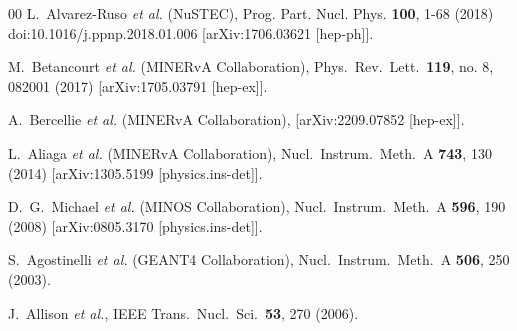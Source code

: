 \documentclass[aps,prl,twocolumn,superscriptaddress,nofootinbib]{revtex4}
\begin{document}
\begin{thebibliography}{00}
L.~Alvarez-Ruso \textit{et al.} (NuSTEC),
Prog. Part. Nucl. Phys. \textbf{100}, 1-68 (2018)
doi:10.1016/j.ppnp.2018.01.006
[arXiv:1706.03621 [hep-ph]].


  M.~Betancourt {\it et al.} (MINERvA Collaboration),
  Phys.\ Rev.\ Lett.\  {\bf 119}, no. 8, 082001 (2017)
  [arXiv:1705.03791 [hep-ex]].
  
A.~Bercellie \textit{et al.} (MINERvA Collaboration),
[arXiv:2209.07852 [hep-ex]].

  L.~Aliaga {\it et al.} (MINERvA Collaboration),
  Nucl.\ Instrum.\ Meth.\ A {\bf 743}, 130 (2014)
  [arXiv:1305.5199 [physics.ins-det]].

  D.~G.~Michael {\it et al.} (MINOS Collaboration),
  Nucl.\ Instrum.\ Meth.\ A {\bf 596}, 190 (2008)
  [arXiv:0805.3170 [physics.ins-det]].
  
  S.~Agostinelli {\it et al.} (GEANT4 Collaboration),
  Nucl.\ Instrum.\ Meth.\ A {\bf 506}, 250 (2003).

  J.~Allison {\it et al.},
  IEEE Trans.\ Nucl.\ Sci.\  {\bf 53}, 270 (2006).


\end{thebibliography}
\end{document}
